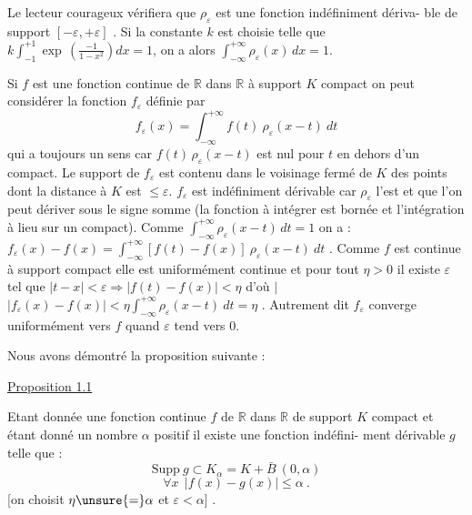 
Le lecteur courageux vérifiera que $\rho_\varepsilon$ est une fonction indéfiniment dériva-%
ble de support $[-\varepsilon,+\varepsilon]$ . Si la constante $k$ est choisie telle que
$k\int_{-1}^{+1} \exp\,(\frac{-1}{1-x^2})dx = 1$, on a alors $\int_{-\infty}^{+\infty} \rho_\varepsilon(x)\,dx = 1$.

Si $f$ est une fonction continue de $\mathbb{R}$ dans $\mathbb{R}$ à support $K$ compact on peut
considérer la fonction $f_\varepsilon$ définie par
\[ f_\varepsilon(x) = \int_{-\infty}^{+\infty} f(t)\ \rho_\varepsilon(x-t)\ dt \]
qui a toujours un sens car $f(t)\,\rho_\varepsilon(x-t)$ est nul pour $t$ en dehors d'un
compact. Le support de $f_\varepsilon$ est contenu dans le voisinage fermé de $K$ des
points dont la distance à $K$ est $\leq \varepsilon$. $f_\varepsilon$ est indéfiniment dérivable car
$\rho_\varepsilon$ l'est et que l'on peut dériver sous le signe somme (la fonction à intégrer
est bornée et l'intégration à lieu sur un compact). Comme $\int_{-\infty}^{+\infty} \rho_\varepsilon(x-t)\,dt = 1$
on a : $f_\varepsilon(x) - f(x) = \int_{-\infty}^{+\infty} [f(t) - f(x)]\ \rho_\varepsilon(x-t)\ dt$ . Comme $f$ est continue
à support compact elle est uniformément continue et pour tout $\eta > 0$ il
existe $\varepsilon$ tel que $|t-x| < \varepsilon \Rightarrow |f(t) - f(x)| < \eta$ d'où $|$
$|f_\varepsilon(x) - f(x)| < \eta \int_{-\infty}^{+\infty} \rho_\varepsilon(x-t)\ dt = \eta$ .
Autrement dit $f_\varepsilon$ converge uniformément vers $f$ quand $\varepsilon$ tend vers $0$.

Nous avons démontré la proposition suivante :

\uline{Proposition 1.1}

Etant donnée une fonction continue $f$ de $\mathbb{R}$ dans $\mathbb{R}$ de support $K$
compact et étant donné un nombre $\alpha$ positif il existe une fonction indéfini-%
ment dérivable $g$ telle que :
\[ \mathrm{Supp}\ g \subset K_\alpha = K + \bar{B}\ (0,\alpha) \]
\[ \forall x\ \ |f(x) - g(x)| \leq \alpha\ . \]
[on choisit $\eta \unsure{=} \alpha$ et $\varepsilon < \alpha$] .

